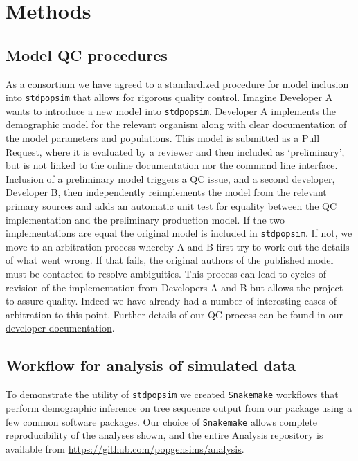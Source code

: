 \documentclass[12pt,halfline,a4paper]{ouparticle}
\newcommand{\stdpopsim}{\texttt{stdpopsim}\xspace}
\begin{document}
\section*{Methods}

\subsection*{Model QC procedures}
As a consortium we have agreed to a standardized procedure for model inclusion
into \stdpopsim that allows for rigorous quality control. Imagine Developer A
wants to introduce a new model into \stdpopsim. Developer A implements the
demographic model for the relevant organism along with clear documentation
of the model parameters and populations. This model is submitted as a Pull Request,
where it is evaluated by a reviewer and then included as `preliminary',
but is not linked to the online documentation nor the command line interface.
Inclusion of a preliminary model triggers a QC issue, and a second developer,
Developer B, then independently reimplements the model from the relevant
primary sources and adds an automatic unit test for equality between the
QC implementation and the preliminary production model. If the two
implementations are equal the original model is included in \stdpopsim.
If not, we move to an arbitration process whereby A and B first try
to work out the details of what went wrong. If that fails, the original
authors of the published model must be contacted
to resolve ambiguities. This process can lead to cycles of revision of
the implementation from Developers A and B but allows the project to assure
quality. Indeed we have already had a number of interesting cases of arbitration
to this point. Further details of our QC process can be found in our
\href{https://stdpopsim.readthedocs.io/en/latest/development.html#}{developer documentation}.

\subsection*{Workflow for analysis of simulated data}
To demonstrate the utility of \stdpopsim we created \texttt{Snakemake}
workflows \citep{koster2012snakemake} that perform demographic inference on
tree sequence output from our package using a few common software packages.
Our choice of \texttt{Snakemake} allows complete reproducibility of the
analyses shown, and the entire Analysis repository is available from
\url{https://github.com/popgensims/analysis}.
\end{document}
